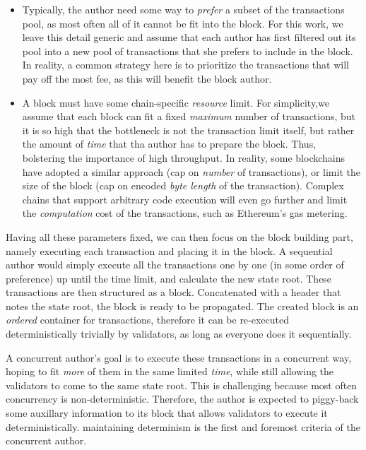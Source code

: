 \begin{itemize}
	\item Typically, the author need some way to \textit{prefer} a subset of the transactions pool,
	as most often all of it cannot be fit into the block. For this work, we leave this detail
	generic and assume that each author has first filtered out its pool into a new pool of
	transactions that she prefers to include in the block. In reality, a common strategy here is to
	prioritize the transactions that will pay off the most fee, as this will benefit the block
	author.
	\item A block must have some chain-specific \textit{resource} limit. For simplicity,we assume
	that each block can fit a fixed \textit{maximum} number of transactions, but it is so high that
	the bottleneck is not the transaction limit itself, but rather the amount of \textit{time} that
	tha author has to prepare the block. Thus, bolstering the importance of high throughput. In
	reality, some blockchains have adopted a similar approach (cap on \textit{number} of
	transactions), or limit the size of the block (cap on encoded \textit{byte length} of the
	transaction). Complex chains that support arbitrary code execution will even go further and
	limit the \textit{computation} cost of the transactions, such as Ethereum's gas
	metering\cite{perezBrokenMetreAttacking2020}.
\end{itemize}

Having all these parameters fixed, we can then focus on the block building part, namely executing
each transaction and placing it in the block. A sequential author would simply execute all the
transactions one by one (in some order of preference) up until the time limit, and calculate the new
state root. These transactions are then structured as a block. Concatenated with a header that notes
the state root, the block is ready to be propagated. The created block is an \textit{ordered}
container for transactions, therefore it can be re-executed deterministically trivially by
validators, as long as everyone does it sequentially.

A concurrent author's goal is to execute these transactions in a concurrent way, hoping to fit
\textit{more} of them in the same limited \textit{time}, while still allowing the validators to come
to the same state root. This is challenging because most often concurrency is non-deterministic.
Therefore, the author is expected to piggy-back some auxillary information to its block that allows
validators to execute it deterministically. maintaining determinism is the first and foremost
criteria of the concurrent author.

